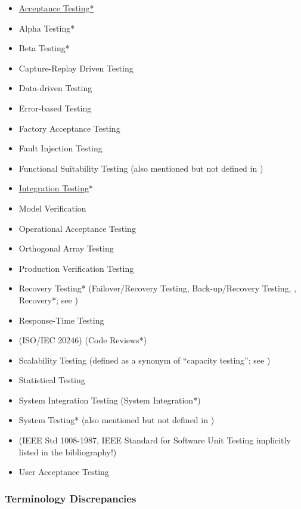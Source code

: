     \begin{itemize}
        \item \underline{Acceptance Testing*}
        \item Alpha Testing*
        \item Beta Testing*
        \item Capture-Replay Driven Testing
        \item Data-driven Testing
        \item Error-based Testing
        \item Factory Acceptance Testing
        \item Fault Injection Testing
        \item Functional Suitability Testing (also mentioned but not defined in
              \citep{IEEE2017})
        \item \underline{Integration Testing}*
        \item Model Verification
        \item Operational Acceptance Testing
        \item Orthogonal Array Testing
        \item Production Verification Testing
        \item Recovery Testing* (Failover/Recovery Testing, Back-up/Recovery
              Testing, ,
              Recovery*; see )
        \item Response-Time Testing
        \item {} (ISO/IEC 20246) (Code Reviews*)
        \item Scalability Testing (defined as a synonym of ``capacity
              testing''; see )
        \item Statistical Testing
        \item System Integration Testing (System Integration*)
        \item System Testing* (also mentioned but not defined in \citep{IEEE2013})
        \item {}
              (IEEE Std 1008-1987, IEEE Standard for
              Software Unit Testing implicitly listed in the bibliography!)
        \item User Acceptance Testing
    \end{itemize}
\fi

\subsubsection{Terminology Discrepancies}
\label{terms}

